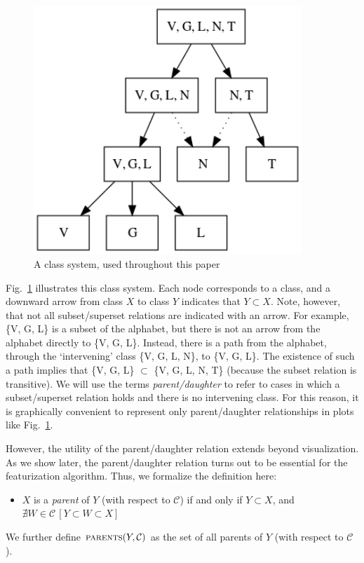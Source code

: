 \documentclass[11pt, oneside]{article}   	%
\begin{document}
\begin{figure}[h]
\includegraphics[width=0.9\textwidth]{manner_poset_privative.png}
\caption{A class system, used throughout this paper}
\label{fig:manner_input}
\end{figure}

Fig.~\ref{fig:manner_input} illustrates this class system. Each node corresponds to a class, and a downward arrow from class $X$ to class $Y$ indicates that $Y \subset X$. Note, however, that not all subset/superset relations are indicated with an arrow. For example, \{V, G, L\} is a subset of the alphabet, but there is not an arrow from the alphabet directly to \{V, G, L\}. Instead, there is a path from the alphabet, through the `intervening' class \{V, G, L, N\}, to \{V, G, L\}. The existence of such a path implies that \{V, G, L\} $\subset$ \{V, G, L, N, T\} (because the subset relation is transitive). We will use the terms \textit{parent/daughter} to refer to cases in which a subset/superset relation holds and there is no intervening class. For this reason, it is graphically convenient to represent only parent/daughter relationships in plots like Fig.~\ref{fig:manner_input}.

However, the utility of the parent/daughter relation extends beyond visualization. As we show later, the parent/daughter relation turns out to be essential for the featurization algorithm. Thus, we formalize the definition here: \begin{itemize}
    \item $X$ is a \textit{parent} of $Y$ (with respect to $\mathcal C$) if and only if $Y \subset X$, and $\nexists W \in \mathcal C \, [Y \subset W \subset X]$
    \end{itemize}
\noindent We further define $\textsc{parents}(Y, \mathcal C)$ as the set of all parents of $Y$ (with respect to $\mathcal C$). 
\end{document}
